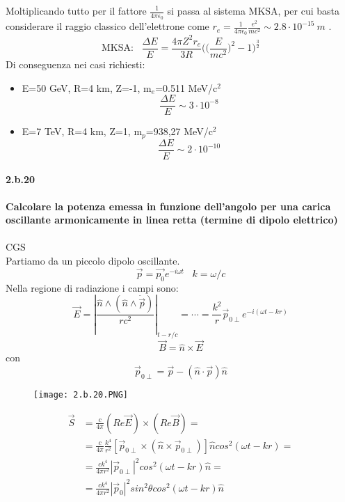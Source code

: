 \documentclass[twoside]{article}
\begin{document}
Moltiplicando tutto per il fattore $\frac{1}{4\pi\epsilon_0}$ si passa al sistema MKSA, per cui basta considerare il raggio classico dell'elettrone come $r_e=\frac{1}{4\pi\epsilon_0}\frac{e^2}{mc^2}\sim 2.8 \cdot 10^{-15} \ m$ .\\
\begin{equation}
    \text{MKSA:} \;\;\; \frac{\Delta E}{E}=\frac{4\pi Z^2r_e}{3R}\biggl(\biggl(\frac{E}{mc^2}\biggr)^2-1\biggr)^{\frac{3}{2}}
\end{equation}
Di conseguenza nei casi richiesti:
\begin{itemize}
    \item E=50 GeV, R=4 km, Z=-1, m$_e$=0.511 MeV/c$^2$
    \begin{equation}
        \frac{\Delta E}{E}\sim 3\cdot 10^{-8}
    \end{equation}
    \item E=7 TeV, R=4 km, Z=1, m$_p$=938,27 MeV/c$^2$
    \begin{equation}
        \frac{\Delta E}{E}\sim 2\cdot 10^{-10}
    \end{equation}
\end{itemize}
\paragraph{2.b.20}\textbf{Calcolare la potenza emessa in funzione dell’angolo per una carica oscillante armonicamente in linea retta (termine di dipolo elettrico)}\\ \\
CGS\\
Partiamo da un piccolo dipolo oscillante. 
\[
\vec{p}=\vec{p_0}e^{- i\omega t} \;\;\; k=\omega/c
\]
Nella regione di radiazione i campi sono:
\begin{equation}
    \vec{E}=\left|\frac{\hat{n} \wedge(\hat{n} \wedge \ddot{\vec{p}})}{r c^2}\right|_{t-r/c}=\cdots =\frac{k^2}{r}\vec{p}_{0\perp}e^{-i (\omega t- kr)}
\end{equation}
\begin{equation}
    \vec{B}=\hat{n} \times \vec{E}
\end{equation}
con
\[
\vec{p}_{0\perp}=\vec{p}-(\hat{n}\cdot \vec{p})\hat{n} 
\]
\begin{figure}[H]
    \centering
    \texttt{[image: 2.b.20.PNG]}
\end{figure}

\begin{align*}
    \vec{S}&=\frac{c}{4 \pi}(Re\vec{E})\times(Re\vec{B})=\\
    &=\frac{c}{4 \pi}\frac{k^4}{r^2}[\vec{p}_{0\perp}\times(\hat{n}\times\vec{p}_{0\perp})]\hat{n}cos^2(\omega t-kr) =\\
    &=\frac{ck^4}{4\pi r^2}|\vec{p}_{0 \perp}|^2 cos^2(\omega t- kr)\hat{n}=\\
    &=\frac{ck^4}{ 4 \pi r^2 }|\vec{p}_0|^2sin^2\theta cos^2(\omega t-k r)\hat{n}\, 
\end{align*}
\end{document}
